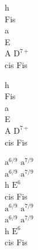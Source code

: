\begin{chord}
    h\\
    Fis\\
    a\\
    E\\
    A $\mathrm{D^{7+}}$\\
    cis Fis

    h\\
    Fis\\
    a\\
    E\\
    A $\mathrm{D^{7+}}$\\
    cis Fis

    $\mathrm{a^{6/9}}$ $\mathrm{a^{7/9}}$\\
    $\mathrm{a^{6/9}}$ $\mathrm{a^{7/9}}$\\
    h $\mathrm{E^6}$\\
    cis Fis\\
    $\mathrm{a^{6/9}}$ $\mathrm{a^{7/9}}$\\
    $\mathrm{a^{6/9}}$ $\mathrm{a^{7/9}}$\\
    h $\mathrm{E^6}$\\
    cis Fis
\end{chord}
